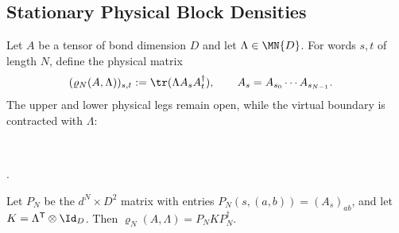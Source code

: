 \subsection{Stationary Physical Block Densities}

\begin{definition}
    \label{def:stationary_physical_block_density}
    \leanok
    Let $A$ be a tensor of bond dimension $D$ and let $\Lambda\in\MN{D}$.
    For words $s,t$ of length $N$, define the physical matrix
    \begin{align}
        (\varrho_N(A,\Lambda))_{s,t}
         & :=\tr(\Lambda A_sA_t^\dagger),
        \qquad A_s=A_{s_0}\cdots A_{s_{N-1}}.
        \label{eq:stationary_density_entries}
    \end{align}
    The upper and lower physical legs remain open, while the virtual boundary is contracted with $\Lambda$:
    \begin{center}
        \tenkzkernel
        \begin{tenkz}[rows={ket,bra}, cols=1, bonds=none,
                west={cup=$\Lambda$}, east=cup]
             \\
        \end{tenkz}.
    \end{center}
\end{definition}

\begin{lemma}
    \label{lem:stationary_density_factorization}
    \leanok
    Let $P_N$ be the $d^N\times D^2$ matrix with entries
    $P_N(s,(a,b))=(A_s)_{ab}$, and let $K=\Lambda^{\mathsf T}\otimes\Id_D$.
    Then $\varrho_N(A,\Lambda)=P_NKP_N^\dagger$.
\end{lemma}

